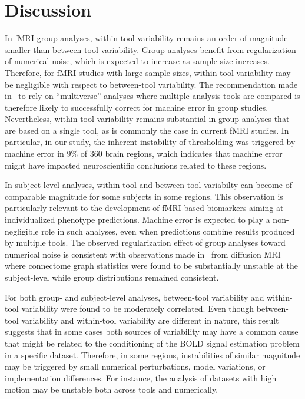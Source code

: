 \documentclass[11pt,onecolumn]{article}
\begin{document}
\section{Discussion}

In fMRI group analyses, within-tool variability remains an order of magnitude smaller
than between-tool variability. Group analyses benefit from regularization
of numerical noise, which is expected to increase as sample size
increases. Therefore, for fMRI studies with large sample sizes, within-tool variability may be negligible with respect to between-tool variability. The
recommendation made in~\cite{botvinik2020variability} to rely on
``multiverse'' analyses where multiple analysis tools are compared is
therefore likely to successfully correct for machine error in group
studies. Nevertheless, within-tool variability remains substantial in group analyses
that are based on a single tool, as is commonly the case in current fMRI
studies. In particular, in our study, the inherent instability of
thresholding was triggered by machine error in 9\% of 360 brain regions,
which indicates that machine error might have impacted neuroscientific
conclusions related to these regions.

In subject-level analyses, within-tool and between-tool variabilty can become
of comparable magnitude for some subjects in some regions. This observation
is particularly relevant to the development of fMRI-based biomarkers aiming
at individualized phenotype predictions. Machine error is expected to play
a non-negligible role in such analyses, even when predictions combine
results produced by multiple tools. The observed regularization effect of
group analyses toward numerical noise is consistent with observations made
in~\cite{kiar2020numerical} from diffusion MRI where connectome graph
statistics were found to be substantially unstable at the subject-level
while group distributions remained consistent. 

For both group- and subject-level analyses, between-tool variability and within-tool
variability were found to be moderately correlated. Even though between-tool
variability and within-tool  variability are different in nature, this result
suggests that in some cases both sources of variability may have a common
cause that might be related to the conditioning of the BOLD signal
estimation problem  in a specific dataset. Therefore, in some regions,
instabilities of similar magnitude may be triggered by small numerical
perturbations, model variations, or implementation differences. For
instance, the analysis of datasets with high motion may be unstable both
across tools and numerically.
\end{document}
